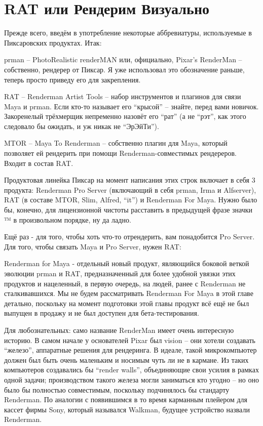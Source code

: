 \chapter*{RAT или Рендерим Визуально}
 
Прежде всего, введём в употребление некоторые
    аббревиатуры, используемые в Пиксаровских продуктах.
    Итак:
  
     prman –
      PhotoRealistic renderMAN или, официально, Pixar’s
      RenderMan – собственно, рендерер от Пиксар. Я уже использовал это
      обозначение раньше, теперь просто приведу его для
      закрепления.

     RAT
      – Renderman Artist Tools – набор инструментов и
      плагинов для связи Maya и prman. Если кто-то называет его “крысой”
      – знайте, перед вами новичок. Закоренелый трёхмерщик непременно
      назовёт его “рат” (а не “рэт”, как этого следовало бы ожидать, и уж
      никак не “ЭрЭйТи”).

     MTOR
      – Maya To Renderman – собственно плагин
      для Maya, который позволяет ей рендерить при помощи
      Renderman-совместимых рендереров. Входит в состав RAT.

 Продуктовая линейка Пиксар на момент написания этих
    строк включает в себя 3 продукта: Renderman Pro Server (включающий
    в себя prman, Irma и Alfserver), RAT (в составе MTOR, Slim, Alfred,
    “it”) и Renderman For Maya. Нужно было бы, конечно, для
    лицензионной чистоты расставить в предыдущей фразе значки ™ в
    произвольном порядке, ну да ладно.

 Ещё раз - для того, чтобы хоть что-то отрендерить,
    вам понадобится Pro Server. Для того, чтобы связать Maya и Pro
    Server, нужен RAT:


 Renderman for Maya - отдельный новый продукт,
    являющийся боковой веткой эволюции prman и RAT, предназначенный для
    более удобной увязки этих продуктов и нацеленный, в первую очередь,
    на людей, ранее с Renderman не сталкивавшихся. Мы не будем
    рассматривать Renderman For Maya в этой главе детально, поскольку
    на момент подготовки этой главы продукт всё ещё не был выпущен в
    продажу и не был доступен для бета-тестирования.

Для
    любознательных: само название
    RenderMan имеет очень интересную историю. В самом начале у
    основателей Pixar был vision – они хотели создавать “железо”,
    аппаратные решения для рендеринга. В идеале, такой микрокомпьютер
    должен был быть очень маленьким и носимым чуть ли не в кармане. Из
    таких компьютеров создавались бы “render walls”, объединяющие свои
    усилия в рамках одной задачи; производством такого железа могли
    заниматься кто угодно – но оно было бы полностью совместимым,
    поскольку подчинялось бы стандарту Renderman. По аналогии с
    появившимся в то время карманным плейером для кассет фирмы Sony,
    который назывался Walkman, будущее устройство назвали
    Renderman.

